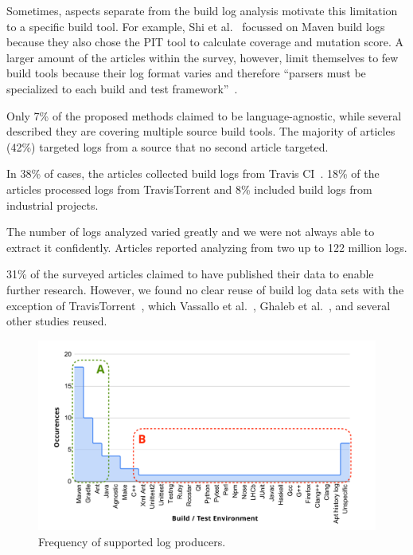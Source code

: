 Sometimes, aspects separate from the build log analysis motivate
this limitation to a specific build tool.
For example, Shi et al.~\cite{shi2018evaluating} focussed on Maven
build logs because they also chose the PIT tool to calculate coverage
and mutation score.
A larger amount of the articles within the survey, however, limit
themselves to few build tools because their log format varies and
therefore ``parsers must be specialized to each build and test
framework''~\cite{tomassi2019bugswarm}.

Only 7\% of the proposed methods claimed to be language-agnostic, while
several described they are covering multiple source build tools.
The majority of articles (42\%) targeted logs from a source that no
second article
targeted.

In 38\% of cases, the articles collected build logs from Travis
CI~\cite{travisci2019webpage}.
18\% of the articles processed logs from TravisTorrent and 8\% included
build logs from industrial projects.

The number of logs analyzed varied greatly and we were not always able to
extract it confidently.
Articles reported analyzing from two up to 122 million logs.

31\% of the surveyed articles claimed to have published their data to
enable further research.
However, we found no clear reuse of build log data sets with the
exception of TravisTorrent~\cite{beller2017travistorrent}, which
Vassallo et al.~\cite{vassallo2017a-tale},
Ghaleb et al.~\cite{ghaleb2019studying}, and several other studies reused.

\begin{figure}[tbhp]
		\centering
		\includegraphics[width=\columnwidth, trim={1.1cm 0.4cm
		1.5cm 0.5cm},
		clip]{img/lit-sur/log_producer_annotated.pdf}
		\caption{Frequency of supported log producers.}
		\label{fig:litsur:log_producer}
\end{figure}


